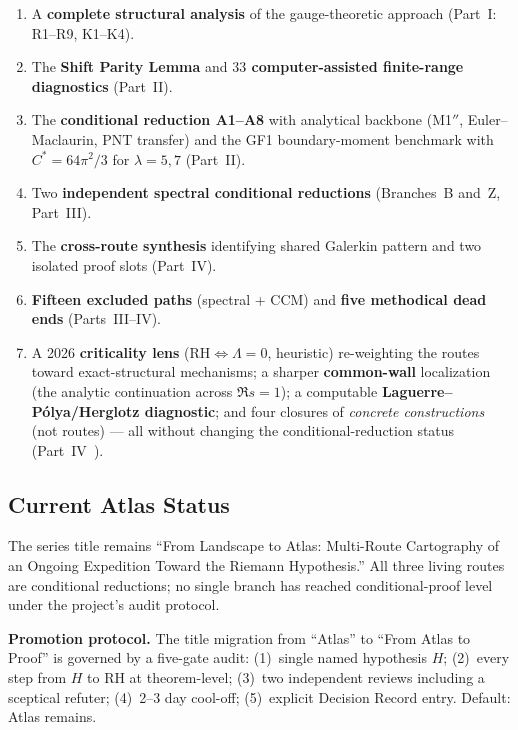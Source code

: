 \documentclass[12pt,a4paper]{article}
\theoremstyle{definition}
\theoremstyle{remark}
\begin{document}
\begin{enumerate}
  \item A \textbf{complete structural analysis} of the gauge-theoretic
    approach (Part~I: R1--R9, K1--K4).
  \item The \textbf{Shift Parity Lemma} and \textbf{$33$
    computer-assisted finite-range diagnostics} (Part~II).
  \item The \textbf{conditional reduction A1--A8} with analytical
    backbone (M1$''$, Euler--Maclaurin, PNT transfer) and the GF1
    boundary-moment benchmark with $C^* = 64\pi^2/3$ for $\lambda=5,7$
    (Part~II).
  \item Two \textbf{independent spectral conditional reductions}
    (Branches~B and~Z, Part~III).
  \item The \textbf{cross-route synthesis} identifying shared Galerkin
    pattern and two isolated proof slots (Part~IV).
  \item \textbf{Fifteen excluded paths} (spectral + CCM) and
    \textbf{five methodical dead ends} (Parts~III--IV).
  \item A 2026 \textbf{criticality lens} ($\mathrm{RH}\Leftrightarrow\Lambda=0$,
    heuristic) re-weighting the routes toward exact-structural mechanisms; a
    sharper \textbf{common-wall} localization (the analytic continuation across
    $\Re s=1$); a computable \textbf{Laguerre--P\'olya/Herglotz diagnostic}; and
    four closures of \emph{concrete constructions} (not routes) --- all without
    changing the conditional-reduction status (Part~IV~\cite{Geiger2026partIV}).
\end{enumerate}


\subsection{Current Atlas Status}

The series title remains ``From Landscape to Atlas: Multi-Route
Cartography of an Ongoing Expedition Toward the Riemann Hypothesis.''
All three living routes are conditional reductions; no single branch has
reached conditional-proof level under the project's audit protocol.

\textbf{Promotion protocol.} The title migration from ``Atlas'' to
``From Atlas to Proof'' is governed by a five-gate audit:
(1)~single named hypothesis $H$;
(2)~every step from $H$ to RH at theorem-level;
(3)~two independent reviews including a sceptical refuter;
(4)~2--3 day cool-off;
(5)~explicit Decision Record entry.
Default: Atlas remains.
\end{document}
